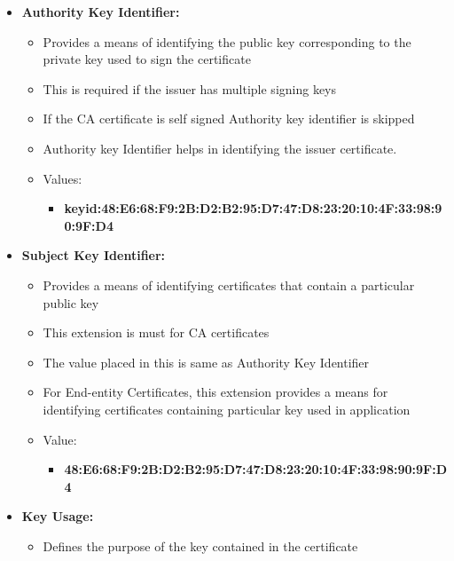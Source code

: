\documentclass[a4paper]{article}
\begin{document}
        \begin{itemize}
            \item \textbf{Authority Key Identifier:}
                \begin{itemize}
                    \item Provides a means of identifying the public key corresponding to the private key used to sign the certificate
                    \item This is required if the issuer has multiple signing keys 
                    \item If the CA certificate is self signed Authority key identifier is skipped
                    \item Authority key Identifier helps in identifying the issuer certificate. 
                    \item Values:
                        \begin{itemize}
                            \item \textbf{keyid:48:E6:68:F9:2B:D2:B2:95:D7:47:D8:23:20:10:4F:33:98:90:9F:D4}
                        \end{itemize}
                \end{itemize}
            \item \textbf{Subject Key Identifier:}
                \begin{itemize}
                    \item Provides a means of identifying certificates that contain a particular public key
                    \item This extension is must for CA certificates
                    \item The value placed in this is same as Authority Key Identifier
                    \item For End-entity Certificates, this extension provides a means for identifying certificates containing particular key used in application
                    \item Value:
                        \begin{itemize}
                            \item \textbf{48:E6:68:F9:2B:D2:B2:95:D7:47:D8:23:20:10:4F:33:98:90:9F:D4}
                        \end{itemize}
                \end{itemize}
            \item \textbf{Key Usage:}
                \begin{itemize}
                    \item Defines the purpose of the key contained in the certificate 

\end{itemize}
\end{itemize}
\end{document}

